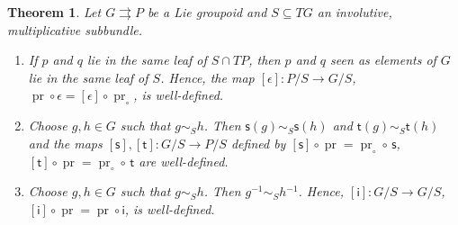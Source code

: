 \documentclass{amsart}
\newtheorem{theorem}{Theorem}[section]
\theoremstyle{definition}
\begin{document}
\begin{theorem}\label{epsilon}
Let $G{{\rightrightarrows}} P$ be a Lie groupoid and $S\subseteq TG$ an involutive, multiplicative 
subbundle.
\begin{enumerate} 
\item If $p$ and $q$ lie in the same leaf of $S\cap TP$, then
$p$ and $q$ seen as elements of $G$ lie in the same leaf of $S$.
Hence, the map $[\epsilon]:P/S\to G/S$, 
$\operatorname{pr}\circ\epsilon=[\epsilon]\circ\operatorname{pr}_\circ$, is  well-defined.
\item Choose $g, h\in G$ such that $g\sim_S h$. Then 
${{\mathsf{s}}}(g)\sim_S{{\mathsf{s}}}(h)$ and ${{\mathsf{t}}}(g)\sim_S{{\mathsf{t}}}(h)$ and the maps
$[{{\mathsf{s}}}], [{{\mathsf{t}}}]:G/S\to P/S$ defined by    
$[{{\mathsf{s}}}]\circ\operatorname{pr}=\operatorname{pr}_\circ\circ\,{{\mathsf{s}}}$, $[{{\mathsf{t}}}]\circ\operatorname{pr}=\operatorname{pr}_\circ\circ\,{{\mathsf{t}}}$ are well-defined.
\item Choose $g, h\in G$ such that $g\sim_S h$. Then 
$g{^{-1}}\sim_S h{^{-1}}$. Hence, 
$[\mathsf i]:G/S\to G/S$, $[\mathsf i]\circ \operatorname{pr}=\operatorname{pr}\circ \mathsf i$, is well-defined.
\end{enumerate}
\end{theorem}
\end{document}
